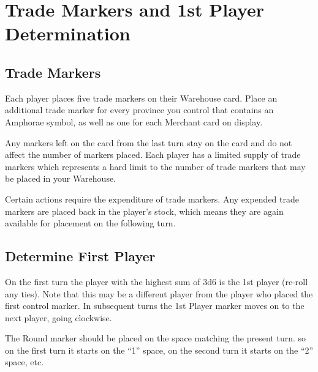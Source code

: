 \section{Trade Markers and 1st Player Determination}

\subsection{Trade Markers}

Each player places five trade markers on their Warehouse card. Place an additional trade marker for every province you control that contains an Amphorae symbol, as well as one for each Merchant card on display.

Any markers left on the card from the last turn stay on the card and do not affect the number of markers placed. Each player has a limited supply of trade markers which represents a hard limit to the number of trade markers that may be placed in your Warehouse.

Certain actions require the expenditure of trade markers. Any expended trade markers are placed back in the player’s stock, which means they are again available for placement on the following turn.

\subsection{Determine First Player}

On the first turn the player with the highest sum of 3d6 is the 1st player (re-roll any ties). Note that this may be a different player from the player who placed the first control marker. In subsequent turns the 1st Player marker moves on to the next player, going clockwise.

The Round marker should be placed on the space matching the present turn. so on the first turn it starts on the “1” space, on the second turn it starts on the “2” space, etc.